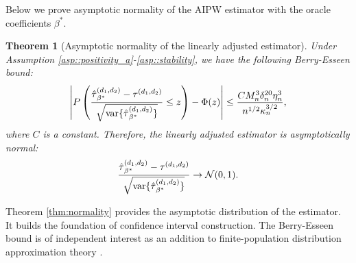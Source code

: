 \documentclass[twoside,letterpaper]{article}
\theoremstyle{plain}
\newtheorem{theorem}{Theorem}[section]
\newtheorem{lemma}[theorem]{Lemma}
\theoremstyle{definition}
\theoremstyle{remark}
\newcommand{\E}{\mathbb{E}}
\newcommand{\var}{\textup{var}}
\newcommand{\cN}{\mathcal{N}}
\newcommand{\sumi}{\sum_{i=1}^n}
\begin{document}
Below we prove asymptotic normality of the AIPW estimator with the oracle coefficients $\beta^*$. 
\begin{theorem}[Asymptotic normality of the linearly adjusted estimator]\label{thm:normality-app}
    Under Assumption \ref{asp::positivity_a}-\ref{asp::stability}, we have the following Berry-Esseen bound:
    \begin{align*}
        \left|P\left(\frac{\hat\tau{}^{(d_1, d_2)}_{\beta^*} - \tau^{(d_1, d_2)}}{\sqrt{\var\{\hat\tau{}^{(d_1, d_2)}_{\beta^*}\}}} \leq z\right) - \Phi(z)\right| \leq \frac{C M_n^3 \delta_n^{20} \eta_n^3}{n^{1/2} \kappa_n^{3/2} },
    \end{align*}
    where $C$ is a constant. Therefore, the linearly adjusted estimator is asymptotically normal:
    \begin{align*}
       \frac{\hat\tau{}^{(d_1, d_2)}_{\beta^*} - \tau^{(d_1, d_2)}}{\sqrt{\var\{\hat\tau{}^{(d_1, d_2)}_{\beta^*}\}}} \rightarrow \cN(0, 1).
    \end{align*}
\end{theorem}
Theorem \ref{thm:normality} provides the asymptotic distribution of the estimator. It builds the foundation of confidence interval construction. The Berry-Esseen bound is of independent interest as an addition to finite-population distribution approximation theory \citep{shi2025berry,Masoero2026multiple}.
\end{document}
